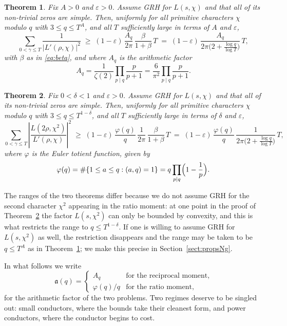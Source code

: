\documentclass[10pt,a4paper]{amsart}
\newtheorem{theorem}{Theorem}
\numberwithin{equation}{section}
\begin{document}
\begin{theorem}\label{thm:MN}
Fix $A>0$ and $\varepsilon>0$. Assume GRH for $L(s,\chi)$ and that all of its non-trivial zeros are simple. Then, uniformly for all primitive characters $\chi$ modulo $q$ with $3\le q\le T^{A}$, and all $T$ sufficiently large in terms of $A$ and $\varepsilon$,
\[
\sum_{0<\gamma\le T}\frac{1}{|L'(\rho,\chi)|^2}
\;\ge\;(1-\varepsilon)\,\frac{A_q}{2\pi}\,\frac{\beta}{1+\beta}\,T
\;=\;(1-\varepsilon)\,\frac{A_q}{2\pi\bigl(2+\frac{\log q}{\log T}\bigr)}\,T ,
\]
with $\beta$ as in \eqref{eq:beta}, and where $A_q$ is the arithmetic factor
\begin{equation}\label{eq:Aq}
A_q=\frac{1}{\zeta(2)}\prod_{p\mid q}\frac{p}{p+1}=\frac{6}{\pi^2}\prod_{p\mid q}\frac{p}{p+1}.
\end{equation}
\end{theorem}


\begin{theorem}\label{thm:Ng}
Fix $0<\delta<1$ and $\varepsilon>0$. Assume GRH for $L(s,\chi)$ and that all of its non-trivial zeros are simple. Then, uniformly for all primitive characters $\chi$ modulo $q$ with $3\le q\le T^{1-\delta}$, and all $T$ sufficiently large in terms of $\delta$ and $\varepsilon$,
\[
\sum_{0<\gamma\le T}\left|\frac{L(2\rho,\chi^2)}{L'(\rho,\chi)}\right|^2
\;\ge\;(1-\varepsilon)\,\frac{\varphi(q)}{q}\,\frac{1}{2\pi}\,\frac{\beta}{1+\beta}\,T
\;=\;(1-\varepsilon)\,\frac{\varphi(q)}{q}\,\frac{1}{2\pi\bigl(2+\frac{\log q}{\log T}\bigr)}\,T,
\]
where $\varphi$ is the Euler totient function, given by
\[
\varphi(q)=\#\{1\le a\le q:(a,q)=1\}=q\prod_{p\mid q}\Bigl(1-\frac1p\Bigr).
\]
\end{theorem}

The ranges of the two theorems differ because we do not assume GRH for the second character $\chi^2$ appearing in the ratio moment: at one point in the proof of Theorem~\ref{thm:Ng} the factor $L(s,\chi^2)$ can only be bounded by convexity, and this is what restricts the range to $q\le T^{1-\delta}$. If one is willing to assume GRH for $L(s,\chi^2)$ as well, the restriction disappears and the range may be taken to be $q\le T^{A}$ as in Theorem~\ref{thm:MN}; we make this precise in Section~\ref{sect:propsNg}.

In what follows we write
\begin{equation}\label{eq:aq}
\mathfrak a(q)=
\begin{cases}
A_q & \text{for the reciprocal moment},\\[2pt]
\varphi(q)/q & \text{for the ratio moment},
\end{cases}
\end{equation}
for the arithmetic factor of the two problems. Two regimes deserve to be singled out: small conductors, where the bounds take their cleanest form, and power conductors, where the conductor begins to cost.
\end{document}
